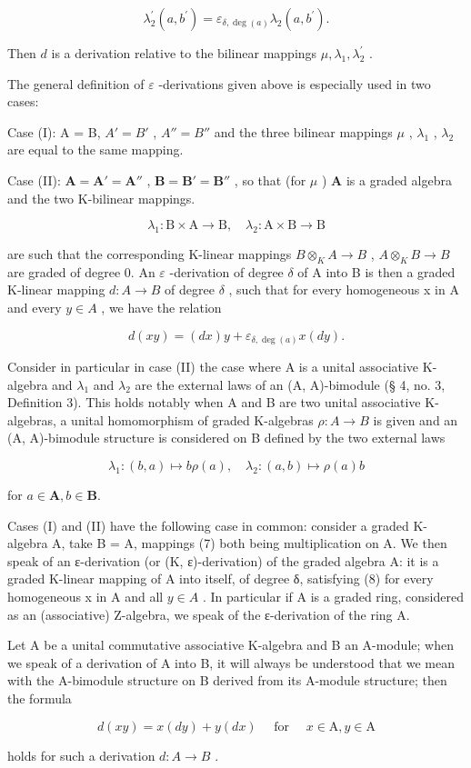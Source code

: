 \[
\lambda_ {2} ^ {\prime} (a, b ^ {\prime}) = \varepsilon_ {\delta , \deg (a)} \lambda_ {2} (a, b ^ {\prime}).
\]

Then \(d\) is a derivation relative to the bilinear mappings \(\mu, \lambda_{1}, \lambda_{2}^{\prime}\) .

The general definition of \(\varepsilon\) -derivations given above is especially used in two cases:

Case (I): A = B, \(A' = B'\) , \(A'' = B''\) and the three bilinear mappings \(\mu\) , \(\lambda_{1}\) , \(\lambda_{2}\) are equal to the same mapping.

Case (II): \(\mathbf{A} = \mathbf{A}' = \mathbf{A}''\) , \(\mathbf{B} = \mathbf{B}' = \mathbf{B}''\) , so that (for \(\mu\) ) \(\mathbf{A}\) is a graded algebra and the two K-bilinear mappings.

\[
\lambda_ {1} \colon \mathrm{B} \times \mathrm{A} \rightarrow \mathrm{B}, \quad \lambda_ {2} \colon \mathrm{A} \times \mathrm{B} \rightarrow \mathrm{B}\tag{7}
\]

are such that the corresponding K-linear mappings \(B \otimes_{K} A \to B\) , \(A \otimes_{K} B \to B\) are graded of degree 0. An \(\varepsilon\) -derivation of degree \(\delta\) of A into B is then a graded K-linear mapping \(d: A \to B\) of degree \(\delta\) , such that for every homogeneous x in A and every \(y \in A\) , we have the relation

\[
d (x y) = (d x) y + \varepsilon_ {\delta , \deg (a)} x (d y).\tag{8}
\]

Consider in particular in case (II) the case where A is a unital associative K-algebra and \(\lambda_{1}\) and \(\lambda_{2}\) are the external laws of an (A, A)-bimodule (§ 4, no. 3, Definition 3). This holds notably when A and B are two unital associative K-algebras, a unital homomorphism of graded K-algebras \(\rho: A \to B\) is given and an (A, A)-bimodule structure is considered on B defined by the two external laws

\[
\lambda_ {1} \colon (b, a) \mapsto b \rho (a), \quad \lambda_ {2} \colon (a, b) \mapsto \rho (a) b
\]

for \(a\in \mathbf{A},b\in \mathbf{B}.\)

Cases (I) and (II) have the following case in common: consider a graded K-algebra A, take B = A, mappings (7) both being multiplication on A. We then speak of an ε-derivation (or (K, ε)-derivation) of the graded algebra A: it is a graded K-linear mapping of A into itself, of degree δ, satisfying (8) for every homogeneous x in A and all \(y \in A\) . In particular if A is a graded ring, considered as an (associative) Z-algebra, we speak of the ε-derivation of the ring A.

Let A be a unital commutative associative K-algebra and B an A-module; when we speak of a derivation of A into B, it will always be understood that we mean with the A-bimodule structure on B derived from its A-module structure; then the formula

\[
d (x y) = x (d y) + y (d x) \quad \text { for } \quad x \in \mathrm{A}, y \in \mathrm{A}\tag{9}
\]

holds for such a derivation \(d: A \rightarrow B\) .

